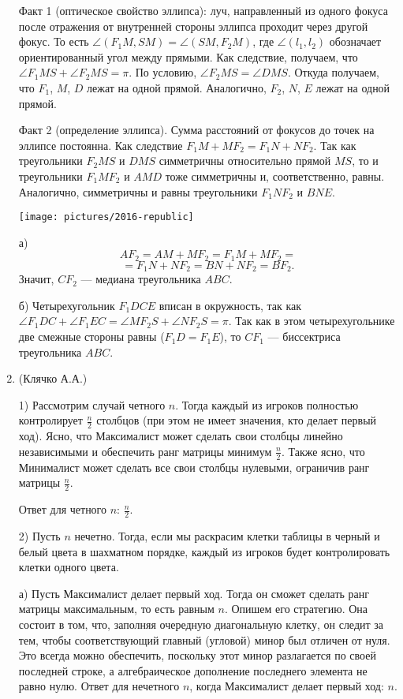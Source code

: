 \documentclass[12pt, a4paper]{article}
\begin{document}
\begin{enumerate}
Факт 1 (оптическое свойство эллипса): луч, направленный из одного фокуса после отражения от внутренней стороны эллипса проходит через другой фокус. То есть $\angle(F_1M, SM) = \angle(SM, F_2M)$, где $\angle(l_1, l_2)$ обозначает ориентированный угол между прямыми. Как следствие, получаем, что $\angle F_1MS + \angle F_2MS = \pi$. По условию, $\angle F_2MS = \angle DMS$. Откуда получаем, что $F_1$, $M$, $D$ лежат на одной прямой. Аналогично, $F_2$, $N$, $E$ лежат на одной прямой.

Факт 2 (определение эллипса). Сумма расстояний от фокусов до точек на эллипсе постоянна. Как следствие $F_1M + MF_2 = F_1N + NF_2$. Так как треугольники $F_2MS$ и $DMS$ симметричны относительно прямой $MS$, то и треугольники $F_1MF_2$ и $AMD$ тоже симметричны и, соответственно, равны. Аналогично, симметричны и равны треугольники $F_1NF_2$ и $BNE$.

\begin{center}
\texttt{[image: pictures/2016-republic]}
\end{center}

а) 
$$AF_2 = AM + MF_2 = F_1M + MF_2 =$$
$$= F_1N + NF_2 = BN + NF_2 = BF_2.$$ 
Значит, $CF_2$ --- медиана треугольника $ABC$.

б) Четырехугольник $F_1DCE$ вписан в окружность, так как $\angle F_1DC + \angle F_1EC = \angle MF_2S + \angle NF_2S = \pi$. Так как в этом четырехугольнике две смежные стороны равны ($F_1D = F_1E$), то $CF_1$ --- биссектриса треугольника $ABC$.

\item (Клячко А.А.)

1) Рассмотрим случай четного $n$. Тогда каждый из игроков полностью контролирует $\frac{n}{2}$ столбцов (при этом не имеет значения, кто делает первый ход). Ясно, что Максималист может сделать свои столбцы линейно независимыми и обеспечить ранг матрицы минимум $\frac{n}{2}$. Также ясно, что Минималист может сделать все свои столбцы нулевыми, ограничив ранг матрицы $\frac{n}{2}$.

Ответ для четного $n$: $\frac{n}{2}$.

2) Пусть $n$ нечетно. Тогда, если мы раскрасим клетки таблицы в черный и белый цвета в шахматном порядке, каждый из игроков будет контролировать клетки одного цвета. 

а) Пусть Максималист делает первый ход. Тогда он сможет сделать ранг матрицы максимальным, то есть равным $n$. Опишем его стратегию. Она состоит в том, что, заполняя очередную диагональную клетку, он следит за тем, чтобы соответствующий главный (угловой) минор был отличен от нуля. Это всегда можно обеспечить, поскольку этот минор разлагается по своей последней строке, а алгебраическое дополнение последнего элемента не равно нулю. 
Ответ для нечетного $n$, когда Максималист делает первый ход: $n$. 


\end{enumerate}
\end{document}
